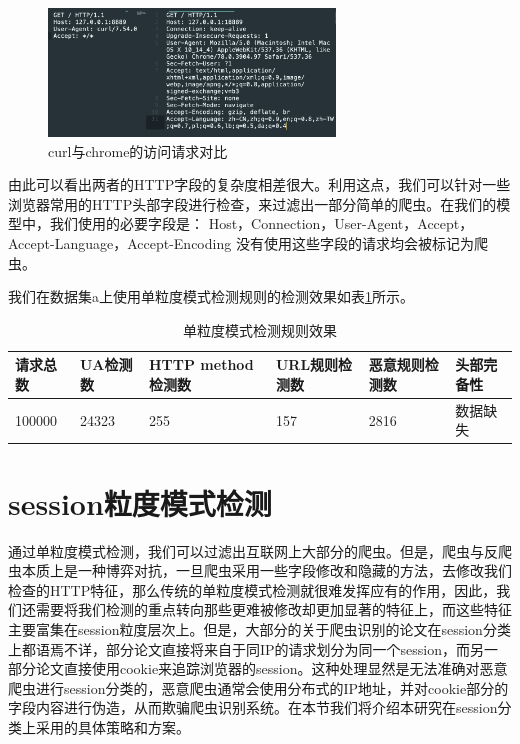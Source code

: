 \documentclass[doctor,privacy,twoside]{buaa_mac}
\begin{document}
\centerline{}
\begin{figure}[!h]
  \centering
  \includegraphics[width=0.68\textwidth]{images/http_request_contrast.png}
  \caption{curl与chrome的访问请求对比}
  \label{fig:curl}
\end{figure}


由此可以看出两者的HTTP字段的复杂度相差很大。利用这点，我们可以针对一些浏览器常用的HTTP头部字段进行检查，来过滤出一部分简单的爬虫。在我们的模型中，我们使用的必要字段是：
Host，Connection，User-Agent，Accept，Accept-Language，Accept-Encoding
没有使用这些字段的请求均会被标记为爬虫。

我们在数据集a上使用单粒度模式检测规则的检测效果如表\ref{tab:single-effect}所示。

\centerline{}
\begin{table}[h]
  \caption{单粒度模式检测规则效果}
  \label{tab:single-effect}
  \centering
\begin{tabular}{|p{2cm}<{\centering}|p{2cm}<{\centering}|p{3cm}<{\centering}|p{2cm}<{\centering}|p{3cm}<{\centering}|p{2cm}<{\centering}|}
    \hline
   请求总数 & UA检测数  & HTTP method检测数 & URL规则检测数 &  恶意规则检测数  & 头部完备性  \\
    \hline
 100000  &  24323     &     255       &        157      &   2816 & 数据缺失 \\

\hline
    \end{tabular}
\end{table}
\centerline{}


\section{session粒度模式检测}
通过单粒度模式检测，我们可以过滤出互联网上大部分的爬虫。但是，爬虫与反爬虫本质上是一种博弈对抗，一旦爬虫采用一些字段修改和隐藏的方法，去修改我们检查的HTTP特征，那么传统的单粒度模式检测就很难发挥应有的作用，因此，我们还需要将我们检测的重点转向那些更难被修改却更加显著的特征上，而这些特征主要富集在session粒度层次上。但是，大部分的关于爬虫识别的论文在session分类上都语焉不详，部分论文直接将来自于同IP的请求划分为同一个session，而另一部分论文直接使用cookie来追踪浏览器的session。这种处理显然是无法准确对恶意爬虫进行session分类的，恶意爬虫通常会使用分布式的IP地址，并对cookie部分的字段内容进行伪造，从而欺骗爬虫识别系统。在本节我们将介绍本研究在session分类上采用的具体策略和方案。
\end{document}
